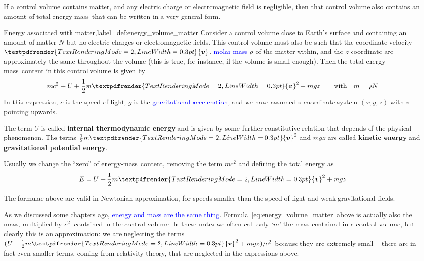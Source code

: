 \documentclass[a4paper,12pt,%
onecolumn,oneside,titlepage,%
british%
]{memoir}
\renewcommand*{\bm}[1]{\textpdfrender{TextRenderingMode=2,LineWidth=0.3pt}{\boldsymbol{#1}}}
\renewcommand*{\|}[1][]{\nonscript\:#1\vert\nonscript\:\mathopen{}}
\newcommand*{\sect}{\S}%
\renewcommand*{\autoref}[2]{\sidepar{\vspace{-1ex}\footnotesize{\color{blue}\faIcon{%
reply%
}\enspace\sect\,\ref{#1} page\,\pageref{#1}}}\textcolor{blue}{#2}}
\newcommand*{\yv}{\bm{v}}
\newcommand*{\yN}{N}
\newcommand*{\yrho}{\rho}
\newcommand*{\yM}{m}%
\newcommand*{\yE}{E}
\newcommand*{\yU}{U}
\newcommand*{\energym}{energy-mass}
\begin{document}
If a control volume contains matter, and any electric charge or electromagnetic field is negligible, then that control volume also contains an amount of total \energym\  that can be written in a very general form.
\begin{definition}{Energy associated with matter,label={def:energy_volume_matter}}
  Consider a control volume close to Earth's surface and containing an amount of matter $\yN$ but no electric charges or electromagnetic fields. This control volume must also be such that the coordinate velocity $\yv$, \autoref{def:molarmass}{molar mass} $\yrho$ of the matter within, and the $z$-coordinate are approximately the same throughout the volume (this is true, for instance, if the volume is small enough). Then the total \energym\ content in this control volume is given by
  \begin{equation}
    \label{eq:energy_volume_matter}
    \yM c^{2} +  \yU + \frac{1}{2}\yM \yv^{2} + \yM g z
    \qquad\text{with}\quad \yM = \yrho\yN
  \end{equation}
In this expression, $c$ is the speed of light, $g$ is the \autoref{sec:supply_momentum_gravity}{gravitational acceleration}, and we have assumed a coordinate system $(x,y,z)$ with $z$ pointing upwards. %

    \smallskip

    The term $\yU$ is called \textbf{internal thermodynamic energy} and is given by some further constitutive relation that depends of the physical phenomenon. The terms $\frac{1}{2}\yM \yv^{2}$ and $\yM g z$ are called \textbf{kinetic energy} and \textbf{gravitational potential energy}.

  \smallskip

  Usually we change the \enquote{zero} of \energym\ content, removing the term $\yM c^{2}$ and defining the total energy as
    \begin{equation}
    \label{eq:thermodynamic_energy}
    \yE = \yU + \frac{1}{2}\yM \yv^{2} + \yM g z
  \end{equation}
\end{definition}
The formulae above are valid in Newtonian approximation, for speeds smaller than the speed of light and weak gravitational fields.

As we discussed some chapters ago, \autoref{sec:mass_is_energy}{energy and mass are the same thing}. Formula~\eqref{eq:energy_volume_matter} above is actually also the mass, multiplied by $c^{2}$, contained in the control volume. In these notes we often call only \enquote*{$\yM$} the mass contained in a control volume, but clearly this is an approximation: we are neglecting the terms $(\yU + \frac{1}{2}\yM \yv^{2} + \yM g z)/c^{2}$ because they are extremely small -- there are in fact even smaller terms, coming from relativity theory, that are neglected in the expressions above.
\end{document}
